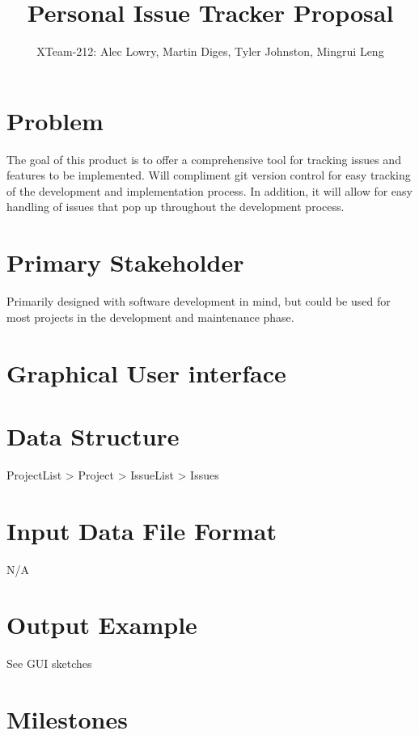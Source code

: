 \documentclass{article}
\title{Personal Issue Tracker Proposal}
\author{XTeam-212: Alec Lowry, Martin Diges, Tyler Johnston, Mingrui Leng}
\begin{document}
\maketitle
\tableofcontents
\newpage

\section{Problem}

The goal of this product is to offer a comprehensive tool for tracking issues and features to be implemented.
Will compliment git version control for easy tracking of the development and implementation process.
In addition, it will allow for easy handling of issues that pop up throughout the development process.

\section{Primary Stakeholder}

Primarily designed with software development in mind, but could be used for most projects in the development and maintenance phase.

\section{Graphical User interface}


\section{Data Structure}

    ProjectList > Project > IssueList > Issues

\section{Input Data File Format}

    N/A

\section{Output Example}

    See GUI sketches

\section{Milestones}
\end{document}
